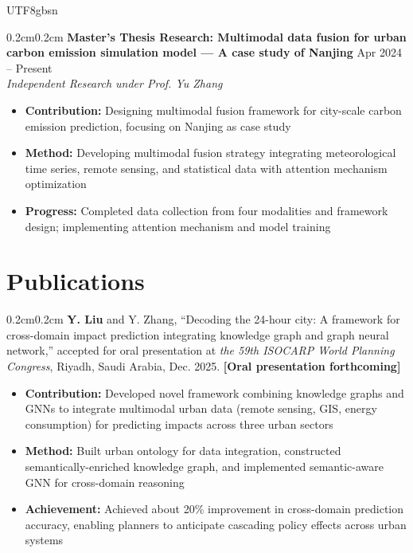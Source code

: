 \documentclass[10pt, letterpaper]{article}
\newenvironment{highlights}{
    \begin{itemize}[
        topsep=0.01cm, parsep=0.01cm, partopsep=0pt, itemsep=0pt,
        leftmargin=2.1em, labelwidth=2em, labelsep=0em,
        align=left
    ]
}{\end{itemize}}
\newenvironment{onecolentry}{\begin{adjustwidth}{0.2cm}{0.2cm}}{\end{adjustwidth}}
\begin{document}
\begin{CJK*}{UTF8}{gbsn}
\begin{onecolentry}
\textbf{Master's Thesis Research: Multimodal data fusion for urban carbon emission simulation model — A case study of Nanjing} \hfill Apr 2024 -- Present\\
\textit{Independent Research under Prof. Yu Zhang}
  \begin{highlights}
    \item \textbf{Contribution:} Designing multimodal fusion framework for city-scale carbon emission prediction, focusing on Nanjing as case study\\[-12pt]
    \item \textbf{Method:} Developing multimodal fusion strategy integrating meteorological time series, remote sensing, and statistical data with attention mechanism optimization\\[-12pt]
    \item \textbf{Progress:} Completed data collection from four modalities and framework design; implementing attention mechanism and model training
  \end{highlights}
\end{onecolentry}

\section{Publications}

\begin{onecolentry}
\textbf{Y. Liu} and Y. Zhang, ``Decoding the 24-hour city: A framework for cross-domain impact prediction integrating knowledge graph and graph neural network,'' accepted for oral presentation at \textit{the 59th ISOCARP World Planning Congress}, Riyadh, Saudi Arabia, Dec. 2025. \textbf{[Oral presentation forthcoming]}
  \begin{highlights}
    \item \textbf{Contribution:} Developed novel framework combining knowledge graphs and GNNs to integrate multimodal urban data (remote sensing, GIS, energy consumption) for predicting impacts across three urban sectors\\[-12pt]
    \item \textbf{Method:} Built urban ontology for data integration, constructed semantically-enriched knowledge graph, and implemented semantic-aware GNN for cross-domain reasoning\\[-12pt]
    \item \textbf{Achievement:} Achieved about 20\% improvement in cross-domain prediction accuracy, enabling planners to anticipate cascading policy effects across urban systems
  \end{highlights}
\end{onecolentry}


\end{CJK*}
\end{document}
